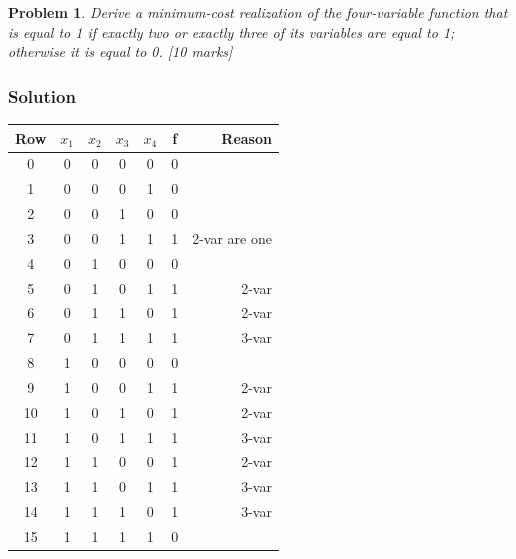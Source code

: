 \documentclass[twocolumn]{article}
\newtheorem{prob}{Problem}
\begin{document}
\begin{prob}
Derive a minimum-cost realization of the four-variable function that is equal to 1 if exactly
two or exactly three of its variables are equal to 1; otherwise it is equal to
0. \cite[Prob 2.46]{brown2013fundamentals} [10 marks]
\end{prob}

\subsubsection*{Solution}

\begin{tabular}{c|cccc||c|r}
  \toprule
  Row & $x_1$  & $x_2$ & $x_3$ & $x_4$ & f & Reason\\
  \midrule
   0 & 0 & 0 &  0 & 0 & 0 & 
   \\
   1 & 0 & 0 &  0 & 1 & 0 &
   \\
   2 & 0 & 0 &  1 & 0 & 0 &
   \\
   3 & 0 & 0 &  1 & 1 & 1 & 2-var are one
   \\
   4 & 0 & 1 &  0 & 0 & 0 & 
   \\
   5 & 0 & 1 &  0 & 1 & 1 & 2-var
   \\
   6 & 0 & 1 &  1 & 0 & 1 & 2-var
   \\
   7 & 0 & 1 &  1 & 1 & 1 & 3-var
   \\
   8 & 1 & 0 &  0 & 0 & 0 & 
   \\
   9 & 1 & 0 &  0 & 1 & 1 & 2-var
  \\
  10 & 1 & 0 &  1 & 0 & 1 & 2-var
  \\
  11 & 1 & 0 &  1 & 1 & 1 & 3-var
  \\
  12 & 1 & 1 &  0 & 0 & 1 & 2-var
  \\
  13 & 1 & 1 &  0 & 1 & 1 & 3-var
  \\
  14 & 1 & 1 &  1 & 0 & 1 & 3-var
  \\
  15 & 1 & 1 &  1 & 1 & 0 &
  \\
  \bottomrule
\end{tabular}
\end{document}
